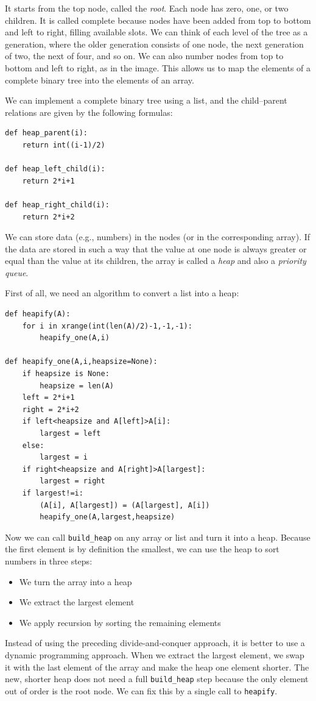 \documentclass[justified,sixbynine]{tufte-book}
\def\ft{\small\tt}
\theoremstyle{plain}%
\theoremstyle{definition}
\theoremstyle{remark}
\begin{document}
\begin{fullwidth}
It starts from the top node, called the {\it root}. Each node has zero, one, or two children. It is called complete because nodes have been added from top to bottom and left to right, filling available slots. We can think of each level of the tree as a generation, where the older generation consists of one node, the next generation of two, the next of four, and so on. We can also number nodes from top to bottom and left to right, as in the image. This allows us to map the elements of a complete binary tree into the elements of an array.

We can implement a complete binary tree using a list, and the child--parent relations are given by the following formulas:
\begin{lstlisting}
def heap_parent(i):
    return int((i-1)/2)

def heap_left_child(i):
    return 2*i+1

def heap_right_child(i):
    return 2*i+2
\end{lstlisting}

We can store data (e.g., numbers) in the nodes (or in the corresponding array). If the data are
stored in such a way that the value at one node is always greater or equal than the value at its children, the array is called a {\it heap} and also a {\it priority queue}.

First of all, we need an algorithm to convert a list into a heap:

\begin{lstlisting}
def heapify(A):
    for i in xrange(int(len(A)/2)-1,-1,-1):
        heapify_one(A,i)

def heapify_one(A,i,heapsize=None):
    if heapsize is None:
        heapsize = len(A)
    left = 2*i+1
    right = 2*i+2
    if left<heapsize and A[left]>A[i]:
        largest = left
    else:
        largest = i
    if right<heapsize and A[right]>A[largest]:
        largest = right
    if largest!=i:
        (A[i], A[largest]) = (A[largest], A[i])
        heapify_one(A,largest,heapsize)
\end{lstlisting}

Now we can call {\ft build\_heap} on any array or list and turn it into a heap.
Because the first element is by definition the smallest, we can use the heap to sort numbers in three steps:
\begin{itemize}
\item We turn the array into a heap
\item We extract the largest element
\item We apply recursion by sorting the remaining elements
\end{itemize}
Instead of using the preceding divide-and-conquer approach, it is better to use a dynamic programming approach. When we extract the largest element, we swap it with the last element of the array and make the heap one element shorter. The new, shorter heap does not need a full {\ft build\_heap} step because the only element out of order is the root node. We can fix this by a single call to {\ft heapify}.


\end{fullwidth}
\end{document}
